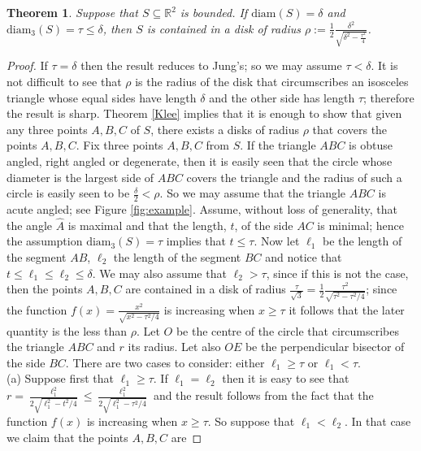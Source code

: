 \documentclass[12pt]{article}
\newtheorem{thm}{Theorem}[section]
\begin{document}
\begin{thm}\label{jung} Suppose that $S\subseteq \mathbb{R}^2$ is bounded. 
If $\text{diam}(S) =\delta$ and $\text{diam}_3(S)=\tau \leq \delta$,
then $S$ is contained in a disk of radius 
$\rho:=\frac{1}{2}\frac{\delta^2}{\sqrt{\delta^2 - \frac{\tau^2}{4}}}$.
\end{thm}
\begin{proof} If $\tau = \delta$ then the result reduces to Jung's; so we may assume $\tau < \delta$.
It is not difficult to see that $\rho$ is the radius of the disk that 
circumscribes an isosceles triangle whose equal sides have length $\delta$ and the other side 
has length $\tau$; therefore the result is sharp. Theorem \ref{Klee} implies that it is enough to
show that given any three points  $A,B,C$ of $S$, there exists a disks of 
radius $\rho$ that covers the points $A,B,C$. Fix three points $A,B,C$ from $S$.
If the triangle $ABC$ is obtuse angled, right angled or 
degenerate, then it is easily seen that 
the circle whose diameter is the largest side of $ABC$ covers the triangle and 
the radius of such a circle is easily seen to be $\frac{\delta}{2}< \rho$. So we may assume that the 
triangle $ABC$ is acute angled;
see Figure \ref{fig:example}. Assume, without loss of generality, that the angle $\hat{A}$ is maximal 
and that the length, $t$, of the side $AC$ is minimal; hence the assumption $\text{diam}_3(S)=\tau$
implies that $t\leq \tau$.
Now let $\ell_1$ be the length of the segment $AB$, $\ell_2$ 
the length of the segment $BC$ and notice that $t\leq \ell_1\leq \ell_2\leq \delta$. 
We may also assume that $\ell_2 > \tau$, since if this is not the case, then  
the points $A,B,C$ 
are contained in a disk of radius 
$\frac{\tau}{\sqrt{3}}=\frac{1}{2}\frac{\tau^2}{\sqrt{\tau^2 - \tau^2/4}}$;
since  the function $f(x)= \frac{x^2}{\sqrt{x^{2} -\tau^2/4} }$ is 
increasing when $x\geq \tau$ it follows that the later quantity is the less than $\rho$.
Let $O$ be the centre of the circle that circumscribes the triangle $ABC$
and $r$ its radius.
Let also $OE$ be the perpendicular bisector of the side $BC$. 
There are two cases to consider: either $\ell_1 \geq \tau$ or $\ell_1 < \tau$. \\
(a) Suppose first that $\ell_1 \geq \tau$.
If $\ell_1 =\ell_2$ then it is easy to see that 
 $r = \frac{\ell_1^2}{2\sqrt{\ell_{1}^{2} -t^2/4}} \leq  \frac{\ell_1^2}{2\sqrt{\ell_{1}^{2} -\tau^2/4}}$ and 
the result follows from the fact that the function $f(x)$ is 
increasing when $x\geq \tau$. So suppose that $\ell_1 < \ell_2$. 
In that case we claim that the points $A,B,C$ are 

\end{proof}
\end{document}

